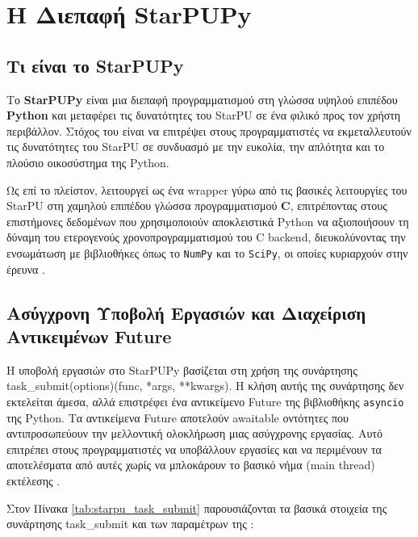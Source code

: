 
\chapter{Η Διεπαφή StarPUPy}

\section{Τι είναι το StarPUPy}

Το \textbf{StarPUPy} είναι μια διεπαφή προγραμματισμού στη γλώσσα υψηλού επιπέδου \textbf{Python} και μεταφέρει τις δυνατότητες του StarPU σε ένα φιλικό προς τον χρήστη περιβάλλον. Στόχος του είναι να επιτρέψει στους προγραμματιστές να εκμεταλλευτούν τις δυνατότητες του StarPU σε συνδυασμό με την ευκολία, την απλότητα και το πλούσιο οικοσύστημα της Python.

Ως επί το πλείστον, λειτουργεί ως ένα wrapper γύρω από τις βασικές λειτουργίες του StarPU στη χαμηλού επιπέδου γλώσσα προγραμματισμού \textbf{C}, επιτρέποντας στους επιστήμονες δεδομένων που χρησιμοποιούν αποκλειστικά Python να αξιοποιήσουν τη δύναμη του ετερογενούς χρονοπρογραμματισμού του C backend, διευκολύνοντας την ενσωμάτωση με βιβλιοθήκες όπως το \texttt{NumPy} και το \texttt{SciPy}, οι οποίες κυριαρχούν στην έρευνα \cite{starpu2025handbook}.

\section{Ασύγχρονη Υποβολή Εργασιών και Διαχείριση Αντικειμένων Future}

Η υποβολή εργασιών στο StarPUPy βασίζεται στη χρήση της συνάρτησης task\_submit\linebreak(options)(func, *args, **kwargs). Η κλήση αυτής της συνάρτησης δεν εκτελείται άμεσα, αλλά επιστρέφει ένα αντικείμενο Future της βιβλιοθήκης \texttt{asyncio} της Python. Τα αντικείμενα Future αποτελούν awaitable οντότητες που αντιπροσωπεύουν την μελλοντική ολοκλήρωση μιας ασύγχρονης εργασίας. Αυτό επιτρέπει στους προγραμματιστές να υποβάλλουν εργασίες και να περιμένουν τα αποτελέσματα από αυτές χωρίς να μπλοκάρουν το βασικό νήμα (main thread) εκτέλεσης \cite{starpu2025handbook}.

Στον Πίνακα \ref{tab:starpu_task_submit} παρουσιάζονται τα βασικά στοιχεία της συνάρτησης task\_submit και των παραμέτρων της \cite{starpu2025handbook}:

